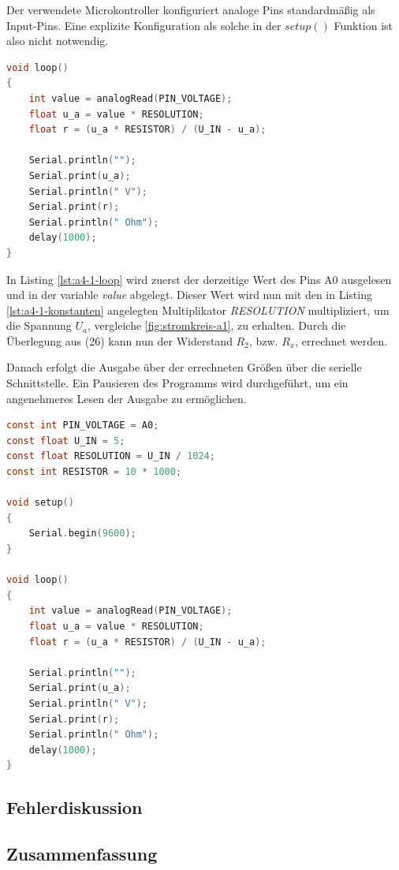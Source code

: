 Der verwendete Microkontroller konfiguriert analoge Pins standardmäßig als Input-Pins.
Eine explizite Konfiguration als solche in der $setup()$ Funktion ist also nicht notwendig.

\begin{lstlisting}[language=C,label={lst:a4-1-loop}, caption={Programmschleife der Aufgabe 4.1}]
void loop()
{
    int value = analogRead(PIN_VOLTAGE);
    float u_a = value * RESOLUTION;
    float r = (u_a * RESISTOR) / (U_IN - u_a);

    Serial.println("");
    Serial.print(u_a);
    Serial.println(" V");
    Serial.print(r);
    Serial.println(" Ohm");
    delay(1000);
}
\end{lstlisting}

In Listing \ref{lst:a4-1-loop} wird zuerst der derzeitige Wert des Pins A0 ausgelesen und in der variable \textit{value} abgelegt.
Dieser Wert wird nun mit den in Listing \ref{lst:a4-1-konstanten} angelegten Multiplikator \textit{RESOLUTION} multipliziert, um die Spannung $U_a$, vergleiche \ref{fig:stromkreis-a1}, zu erhalten.
Durch die Überlegung aus (26) kann nun der Widerstand $R_2$, bzw. $R_x$, errechnet werden.

Danach erfolgt die Ausgabe über der errechneten Größen über die serielle Schnittstelle.
Ein Pausieren des Programms wird durchgeführt, um ein angenehmeres Lesen der Ausgabe zu ermöglichen.

\begin{lstlisting}[language=C,label={lst:a4-1-programmcode}, caption={Vollständiger Programmcode der Aufgabe 4.1}]
const int PIN_VOLTAGE = A0;
const float U_IN = 5;
const float RESOLUTION = U_IN / 1024;
const int RESISTOR = 10 * 1000;

void setup()
{
    Serial.begin(9600);
}

void loop()
{
    int value = analogRead(PIN_VOLTAGE);
    float u_a = value * RESOLUTION;
    float r = (u_a * RESISTOR) / (U_IN - u_a);

    Serial.println("");
    Serial.print(u_a);
    Serial.println(" V");
    Serial.print(r);
    Serial.println(" Ohm");
    delay(1000);
}
\end{lstlisting}

\subsection{Fehlerdiskussion}
\label{subsec:a4-fehlerdiskussion}

\subsection{Zusammenfassung}
\label{subsec:a4-zusammenfassung2}
